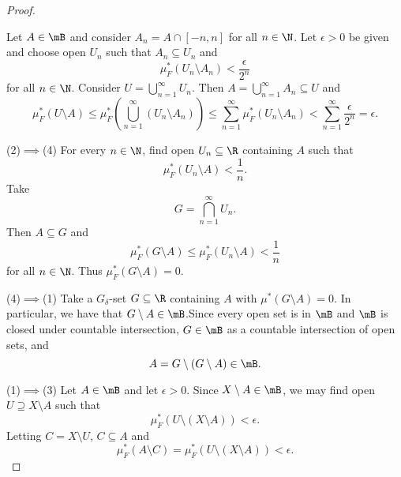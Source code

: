 \documentclass[pmath451]{subfiles}
\begin{document}
\begin{proof}
        \begin{case}
            Let $A\in\mB$ and consider $A_n = A\cap\left[ -n,n \right]$ for all $n\in\N$. Let $\epsilon>0$ be given and choose open $U_n$ such that $A_n\subseteq U_n$ and
            \begin{equation*}
                \mu_F^{*}\left( U_n\setminus A_n \right) < \frac{\epsilon}{2^n}
            \end{equation*}
            for all $n\in\N$. Consider $U = \bigcup^{\infty}_{n=1} U_n$. Then $A = \bigcup^{\infty}_{n=1} A_n\subseteq U$ and
            \begin{equation*}
                \mu_F^{*}\left( U\setminus A \right) \leq \mu_F^{*}\left( \bigcup^{\infty}_{n=1} \left( U_n\setminus A_n \right) \right) \leq \sum^{\infty}_{n=1} \mu_F^{*}\left( U_n\setminus A_n \right) < \sum^{\infty}_{n=1} \frac{\epsilon}{2^n} = \epsilon.
            \end{equation*}
        \end{case}

        (2)$\implies$(4) For every $n\in\N$, find open $U_n\subseteq\R$ containing $A$ such that
        \begin{equation*}
            \mu_F^{*}\left( U_n\setminus A \right) < \frac{1}{n}.
        \end{equation*}
        Take
        \begin{equation*}
            G = \bigcap^{\infty}_{n=1} U_n.
        \end{equation*}
        Then $A\subseteq G$ and
        \begin{equation*}
            \mu_F^{*}\left( G\setminus A \right) \leq \mu_F^{*}\left( U_n\setminus A \right) < \frac{1}{n}
        \end{equation*}
        for all $n\in\N$. Thus $\mu_F^{*}\left( G\setminus A \right) = 0$.

        (4)$\implies$(1) Take a $G_{\delta}$-set $G\subseteq\R$ containing $A$ with $\mu^{*}\left( G\setminus A \right) = 0$. In particular, we have that $G\setminus A\in\mB$.\footnotemark[1] Since every open set is in $\mB$ and $\mB$ is closed under countable intersection, $G\in\mB$ as a countable intersection of open sets, and
        \begin{equation*}
            A = G\setminus\left( G\setminus A \right)\in\mB.
        \end{equation*}

        (1)$\implies$(3) Let $A\in\mB$ and let $\epsilon>0$. Since $X\setminus A\in\mB$, we may find open $U\supseteq X\setminus A$ such that
        \begin{equation*}
            \mu_F^{*}\left( U\setminus \left( X\setminus A \right) \right) < \epsilon.
        \end{equation*}
        Letting $C = X\setminus U$, $C\subseteq A$ and
        \begin{equation*}
            \mu_F^{*}\left( A\setminus C \right) = \mu_F^{*}\left( U\setminus \left( X\setminus A \right) \right) <\epsilon.
        \end{equation*}


\end{proof}
\end{document}
